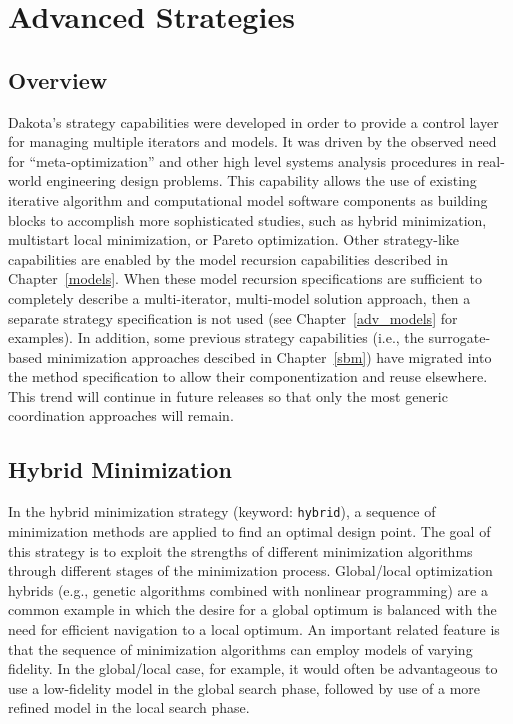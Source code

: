 \chapter{Advanced Strategies}\label{strat}

\section{Overview}\label{strat:overview}

Dakota's strategy capabilities were developed in order to provide a
control layer for managing multiple iterators and models. It was
driven by the observed need for ``meta-optimization'' and other high
level systems analysis procedures in real-world engineering design
problems. This capability allows the use of existing iterative
algorithm and computational model software components as building
blocks to accomplish more sophisticated studies, such as hybrid
minimization, multistart local minimization, or Pareto optimization.
Other strategy-like capabilities are enabled by the model recursion
capabilities described in Chapter~\ref{models}.  When these model
recursion specifications are sufficient to completely describe a
multi-iterator, multi-model solution approach, then a separate
strategy specification is not used (see Chapter~\ref{adv_models} for
examples).  In addition, some previous strategy capabilities (i.e.,
the surrogate-based minimization approaches descibed in
Chapter~\ref{sbm}) have migrated into the method specification to
allow their componentization and reuse elsewhere.  This trend will
continue in future releases so that only the most generic coordination
approaches will remain.

\section{Hybrid Minimization}\label{strat:hybrid}

In the hybrid minimization strategy (keyword: \texttt{hybrid}), a
sequence of minimization methods are applied to find an optimal design
point. The goal of this strategy is to exploit the strengths of
different minimization algorithms through different stages of the
minimization process. Global/local optimization hybrids (e.g., genetic
algorithms combined with nonlinear programming) are a common example
in which the desire for a global optimum is balanced with the need for
efficient navigation to a local optimum. An important related feature
is that the sequence of minimization algorithms can employ models of
varying fidelity. In the global/local case, for example, it would
often be advantageous to use a low-fidelity model in the global search
phase, followed by use of a more refined model in the local search
phase.

